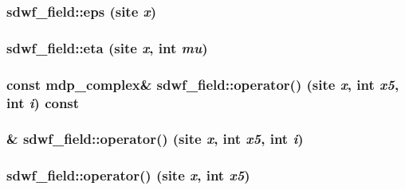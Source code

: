 \label{classsdwf__field_aa834c736322bef716cd0e31a391623d3}
\hypertarget{classsdwf__field_a3cc6aef9972ab5cceab9646578857db0}{
\subsubsection[{eps}]{ sdwf\_\-field::eps (site {\em x})}}
\label{classsdwf__field_a3cc6aef9972ab5cceab9646578857db0}
\hypertarget{classsdwf__field_ae50c1b9db65cd8056ed9286bde99e791}{
\subsubsection[{eta}]{ sdwf\_\-field::eta (site {\em x}, \/  int {\em mu})}}
\label{classsdwf__field_ae50c1b9db65cd8056ed9286bde99e791}
\hypertarget{classsdwf__field_a205e5f728691c6bfe350335a477e42c7}{
\subsubsection[{operator()}]{\setlength{\rightskip}{0pt plus 5cm}const {\bf mdp\_\-complex}\& sdwf\_\-field::operator() (site {\em x}, \/  int {\em x5}, \/  int {\em i}) const}}
\label{classsdwf__field_a205e5f728691c6bfe350335a477e42c7}
\hypertarget{classsdwf__field_a1cd68e8911b77c60ecd6a1cd245ec047}{
\subsubsection[{operator()}]{\& sdwf\_\-field::operator() (site {\em x}, \/  int {\em x5}, \/  int {\em i})}}
\label{classsdwf__field_a1cd68e8911b77c60ecd6a1cd245ec047}
\hypertarget{classsdwf__field_a18764312ba3bb72577b2e29429854024}{
\subsubsection[{operator()}]{ sdwf\_\-field::operator() (site {\em x}, \/  int {\em x5})}}
